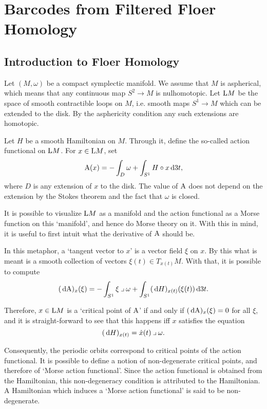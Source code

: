 \chapter{Barcodes from Filtered Floer Homology}\label{chap:bffh}

\section{Introduction to Floer Homology}

Let $(M, \omega)$ be a compact symplectic manifold. We assume that $M$ is aspherical, which means that any continuous map $S^2 \to M$ is nulhomotopic. Let $\LL M$ be the space of smooth contractible loops on $M$, i.e. smooth maps $S^1 \to M$ which can be extended to the disk. By the asphericity condition any such extensions are homotopic.

Let $H$ be a smooth Hamiltonian on $M$. Through it, define the so-called action functional on $\LL M$. For $x \in \LL M$, set
\begin{equation}\label{eq:defaction}
\AA(x) = - \int_D \omega + \int_{S^1} H \circ x \dl3 t,
\end{equation}
where $D$ is any extension of $x$ to the disk. The value of $\AA$ does not depend on the extension by the Stokes theorem and the fact that $\omega$ is closed.

It is possible to visualize $\LL M$ as a manifold and the action functional as a Morse function on this `manifold', and hence do Morse theory on it. With this in mind, it is useful to first intuit what the derivative of $\AA$ should be.

In this metaphor, a `tangent vector to $x$' is a vector field $\xi$ on $x$. By this what is meant is a smooth collection of vectors $\xi(t) \in T_{x(t)} M$. With that, it is possible to compute
\begin{equation}
 (\dl \AA)_x(\xi) = - \int_{S^1} \xi \into \omega + \int_{S^1} (\dl H)_{x(t)} (\xi(t)) \dl3t. 
\end{equation}

Therefore, $x\in \LL M$ is a `critical point of $\AA$' if and only if $(\dl \AA)_x(\xi) = 0$ for all $\xi$, and it is straight-forward to see that this happens iff $x$ satisfies the equation
\begin{equation}
(\dl H)_{x(t)} = \dot x(t) \into \omega.
\end{equation}

Consequently, the periodic orbits correspond to critical points of the action functional. It is possible to define a notion of non-degenerate critical points, and therefore of `Morse action functional'. Since the action functional is obtained from the Hamiltonian, this non-degeneracy condition is attributed to the Hamiltonian. A Hamiltonian which induces a `Morse action functional' is said to be non-degenerate.

